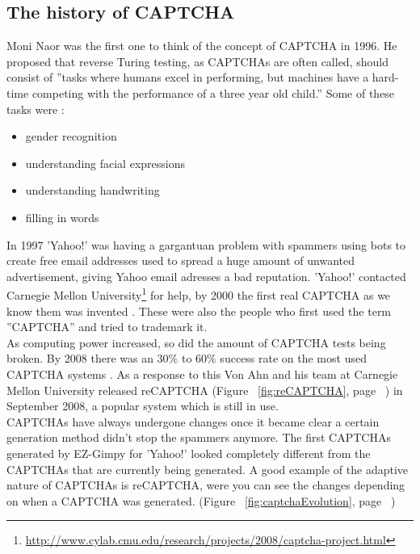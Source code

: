 \documentclass[pdftex,a4paper,12pt,twoside]{report}
\theoremstyle{plain} \newtheorem{theorem}{Theorem} \newtheorem{proposition}{Proposition} \newtheorem{lemma}{Lemma} \newtheorem*{corollary}{Corollary}
\theoremstyle{definition} \newtheorem{definition}{Definition} \newtheorem{conjecture}{Conjecture} \newtheorem*{example}{Example} \newtheorem{algorithm}{Algorithm}
\theoremstyle{remark} \newtheorem*{remark}{Remark} \newtheorem*{note}{Note} \newtheorem{case}{Case}
\begin{document}
\subsection{The history of CAPTCHA}
Moni Naor was the first one to think of the concept of CAPTCHA in 1996. He proposed that reverse Turing testing, as CAPTCHAs are often called, should consist of ''tasks where humans excel in performing, but machines have a hard-time competing with the performance of a three year old child.'' Some of these tasks were \citep{Naor1996}:
\begin{itemize}
\item gender recognition
\item understanding facial expressions
\item understanding handwriting
\item filling in words
\end{itemize}
In 1997 'Yahoo!' was having a gargantuan problem with spammers using bots to create free email addresses used to spread a huge amount of unwanted advertisement, giving Yahoo email adresses a bad reputation. 'Yahoo!' contacted Carnegie Mellon University\footnote{\url{http://www.cylab.cmu.edu/research/projects/2008/captcha-project.html}} for help, by 2000 the first real CAPTCHA as we know them was invented \citep{Egen2009}. These were also the people who first used the term ''CAPTCHA'' and tried to trademark it.\\As computing power increased, so did the amount of CAPTCHA tests being broken. By 2008 there was an 30\% to 60\% success rate on the most used CAPTCHA systems \citep{Yan2008}. As a  response to this Von Ahn and his team at Carnegie Mellon University released reCAPTCHA (Figure ~\ref{fig:reCAPTCHA}, page ~\pageref{fig:reCAPTCHA}) in September 2008, a popular system which is still in use.\\CAPTCHAs have always undergone changes once it became clear a certain generation method didn't stop the spammers anymore. The first CAPTCHAs generated by EZ-Gimpy for 'Yahoo!' looked completely different from the CAPTCHAs that are currently being generated. A good example of the adaptive nature of CAPTCHAs is reCAPTCHA, were you can see the changes depending on when a CAPTCHA was generated. (Figure ~\ref{fig:captchaEvolution}, page ~\pageref{fig:captchaEvolution})
\end{document}
